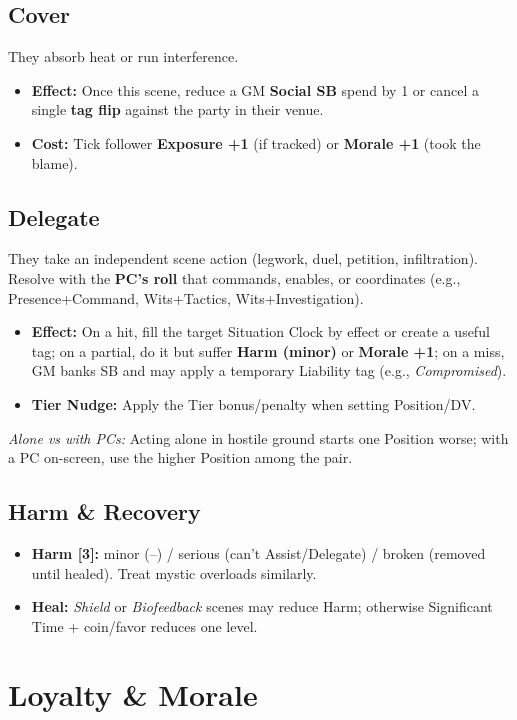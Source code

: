 \subsection{Cover}
They absorb heat or run interference.
\begin{itemize}
  \item \textbf{Effect:} Once this scene, reduce a GM \textbf{Social SB} spend by 1 or cancel a single \textbf{tag flip} against the party in their venue.
  \item \textbf{Cost:} Tick follower \textbf{Exposure +1} (if tracked) or \textbf{Morale +1} (took the blame).
\end{itemize}

\subsection{Delegate}
They take an independent scene action (legwork, duel, petition, infiltration). Resolve with the \textbf{PC's roll} that commands, enables, or coordinates (e.g., Presence+Command, Wits+Tactics, Wits+Investigation).
\begin{itemize}
  \item \textbf{Effect:} On a hit, fill the target Situation Clock by effect or create a useful tag; on a partial, do it but suffer \textbf{Harm (minor)} or \textbf{Morale +1}; on a miss, GM banks SB and may apply a temporary Liability tag (e.g., \emph{Compromised}).
  \item \textbf{Tier Nudge:} Apply the Tier bonus/penalty when setting Position/DV.
\end{itemize}
\emph{Alone vs with PCs:} Acting alone in hostile ground starts one Position worse; with a PC on-screen, use the higher Position among the pair.

\subsection{Harm \& Recovery}
\begin{itemize}
  \item \textbf{Harm [3]:} minor (--) / serious (can't Assist/Delegate) / broken (removed until healed). Treat mystic overloads similarly.
  \item \textbf{Heal:} \emph{Shield} or \emph{Biofeedback} scenes may reduce Harm; otherwise Significant Time + coin/favor reduces one level.
\end{itemize}

\section{Loyalty \& Morale}

